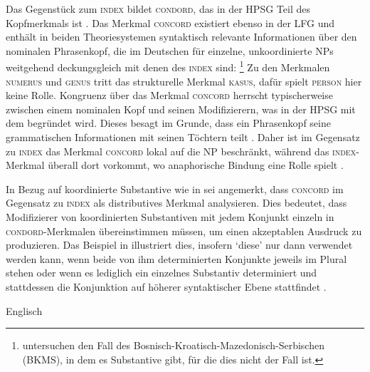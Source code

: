 \label{phsec:concord}
Das Gegenstück zum \textsc{index} bildet \textsc{condord}, das in der HPSG Teil
des Kopfmerkmals ist \autocite[17]{wechslerzlatic2003}. Das Merkmal
\textsc{concord} existiert ebenso in der LFG \autocite[189--192]{bresnanetal2016}
und enthält in beiden Theoriesystemen syntaktisch relevante Informationen über
den nominalen Phrasenkopf, die im Deutschen für einzelne, unkoordinierte NPs
weitgehend deckungsgleich mit denen des \textsc{index} sind:%
%
	\footnote{\citet{wechslerzlatic2003} untersuchen den Fall des
	Bosnisch-Kroatisch-Mazedonisch-Serbischen (BKMS), in dem es Substantive
	gibt, für die dies nicht der Fall ist.}
%
Zu den Merkmalen \textsc{numerus} und \textsc{genus} tritt das strukturelle
Merkmal \textsc{kasus}, dafür spielt \textsc{person} hier keine Rolle.
Kongruenz über das Merkmal \textsc{concord} herrscht typischerweise zwischen
einem nominalen Kopf und seinen Modifizierern, was in der HPSG mit dem
 begründet wird. Dieses besagt im Grunde, dass ein
Phrasenkopf seine grammatischen Informationen mit seinen Töchtern teilt
\autocite[vgl.][22]{wechslerzlatic2003}. Daher ist im Gegensatz zu
\textsc{index} das Merkmal \textsc{concord} lokal auf die NP beschränkt,
während das \textsc{index}-Merkmal überall dort vorkommt, wo anaphorische
Bindung eine Rolle spielt
\parencites[14--16, 22]{wechslerzlatic2003}[189]{bresnanetal2016}.

In Bezug auf koordinierte Substantive wie in  sei angemerkt,
dass \citet[76--78]{kingdalrymple2004} \textsc{concord} im Gegensatz zu
\textsc{index} als distributives Merkmal analysieren. Dies bedeutet, dass
Modifizierer von koordinierten Substantiven mit jedem Konjunkt einzeln in
\textsc{condord}-Merkmalen übereinstimmen müssen, um einen akzeptablen Ausdruck
zu produzieren. Das Beispiel in  illustriert dies,
insofern  `diese' nur dann verwendet werden kann, wenn beide von ihm
determinierten Konjunkte jeweils im Plural stehen 
oder wenn es lediglich ein einzelnes Substantiv determiniert und stattdessen
die Konjunktion auf höherer syntaktischer Ebene stattfindet
.

\begin{exe}
\ex\label{ex:engartdiscong}
	Englisch \parencite[nach][70]{kingdalrymple2004}
	\begin{xlist}
		\label{ex:engartdiscong_1}
		\label{ex:engartdiscong_2}
		\label{ex:engartdiscong_3}
		\label{ex:engartdiscong_4}
	\end{xlist}
\end{exe}

